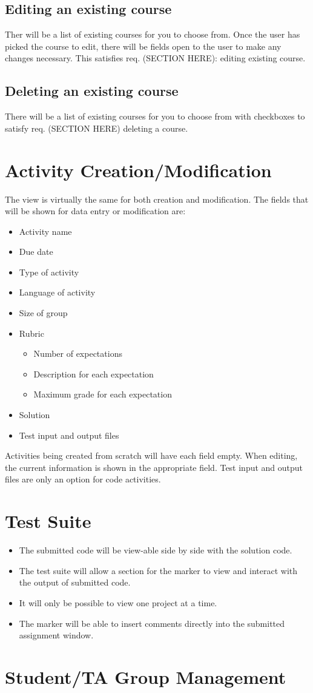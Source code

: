 \documentclass{article}
\begin{document}
\subsection{Editing an existing course}
Ther will be a list of existing courses for you to choose from. Once the user has
picked the course to edit, there will be fields open to the user to make any
changes necessary. This satisfies req.
(SECTION HERE): editing existing course.

\subsection{Deleting an existing course}
There will be a list of existing courses for you to choose from with checkboxes
to satisfy req. (SECTION HERE) deleting a course.

\section{Activity Creation/Modification}
The view is virtually the same for both creation and modification.
The fields that will be shown for data entry or modification are:
\begin{itemize}
	\item Activity name
	\item Due date
	\item Type of activity
	\item Language of activity
	\item Size of group
	\item Rubric
	\begin{itemize}
		\item Number of expectations
		\item Description for each expectation
		\item Maximum grade for each expectation
	\end{itemize}
	\item Solution
	\item Test input and output files
\end{itemize}

Activities being created from scratch will have each field empty.
When editing, the current information is shown in the appropriate field.
Test input and output files are only an option for code activities.

\section{Test Suite}
\begin{itemize}
  \item The submitted code will be view-able side by side with the solution code.
  \item The test suite will allow a section for the marker to view and interact
    with the output of submitted code.
  \item It will only be possible to view one project at a time.
  \item The marker will be able to insert comments directly into the submitted assignment window.
\end{itemize}

\section{Student/TA Group Management}
\end{document}
